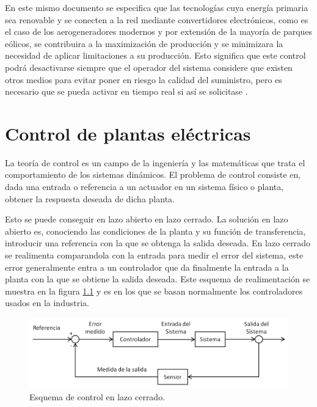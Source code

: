 \documentclass{book}
\begin{document}
En este mismo documento se especifica que las tecnolog\'ias cuya energ\'ia primaria sea renovable y se conecten a la red mediante convertidores electr\'onicos, como es el caso de los aerogeneradores modernos y por extensi\'on de la mayor\'ia de parques e\'olicos, se contribuira a la maximizaci\'on de producci\'on y se minimizara la necesidad de aplicar limitaciones a su producci\'on. Esto significa que este control podr\'a desactivarse siempre que el operador del sistema considere que existen otros medios para evitar poner en riesgo la calidad del suministro, pero es necesario que se pueda activar en tiempo real si as\'i se solicitase \cite{PO12}. \par

\chapter{Control de plantas el\'ectricas}

La teor\'ia de control es un campo de la ingenier\'ia y las matem\'aticas que trata el comportamiento de los sistemas din\'amicos. El problema de control consiste en, dada una entrada o referencia a un actuador en un sistema f\'isico o planta, obtener la respuesta deseada de dicha planta. \par

Esto se puede conseguir en lazo abierto en lazo cerrado. La solución en lazo abierto es, conociendo las condiciones de la planta y su funci\'on de transferencia, introducir una referencia con la que se obtenga la salida deseada. En lazo cerrado se realimenta comparandola con la entrada para medir el error del sistema, este error generalmente entra a un controlador que da finalmente la entrada a la planta con la que se obtiene la salida deseada. Este esquema de realimentaci\'on se muestra en la figura \ref{FeedBackLoop} y es en los que se basan normalmente los controladores usados en la industria. \par

\begin{figure}[h!]
\centering
\includegraphics[width=1\textwidth]{Realimentacion.PNG}
\caption{Esquema de control en lazo cerrado.}
\label{FeedBackLoop}
\end{figure}
\end{document}
